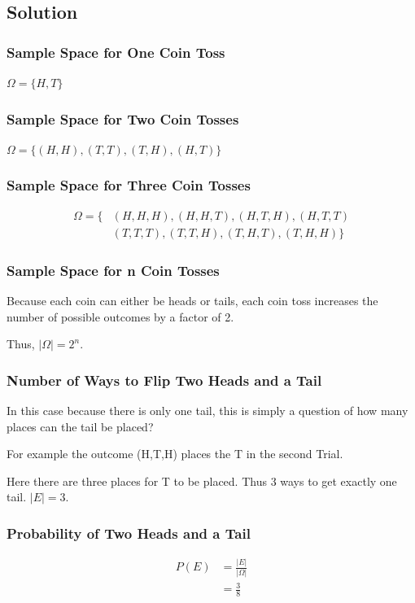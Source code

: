 \documentclass[12pt]{article}
\begin{document}
\subsection{Solution}
\subsubsection{Sample Space for One Coin Toss}
$\Omega = \{H, T\}$

\subsubsection{Sample Space for Two Coin Tosses}
$\Omega = \{(H,H), (T,T), (T,H), (H,T)\}$

\subsubsection{Sample Space for Three Coin Tosses}
\begin{align*}
\Omega  = \{ &(H,H,H), (H,H,T), (H,T,H), (H,T,T) \\
&(T,T,T),(T,T,H),(T,H,T),(T,H,H)\} 
\end{align*}


\subsubsection{Sample Space for n Coin Tosses}
Because each coin can either be heads or tails, each coin toss increases the number of possible outcomes by a factor of 2. 

Thus, $|\Omega| = 2^n$.

\subsubsection{Number of Ways to Flip Two Heads and a Tail}
In this case because there is only one tail, this is simply a question of how many places can the tail be placed?

For example the outcome (H,T,H) places the T in the second Trial.

Here there are three places for T to be placed. Thus 3 ways to get exactly one tail. $|E| = 3$.

\subsubsection{Probability of Two Heads and a Tail}
\begin{align*}
P(E) &= \frac{|E|}{|\Omega|}\\
&= \frac{3}{8}
\end{align*}
\end{document}
